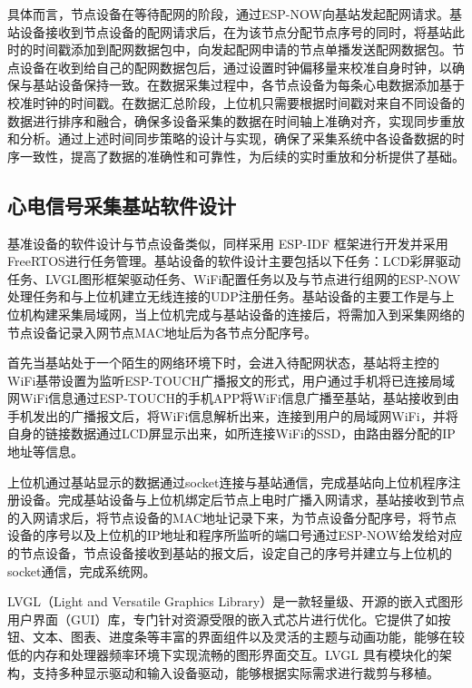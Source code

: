 具体而言，节点设备在等待配网的阶段，通过ESP-NOW向基站发起配网请求。基站设备接收到节点设备的配网请求后，在为该节点分配节点序号的同时，将基站此时的时间戳添加到配网数据包中，向发起配网申请的节点单播发送配网数据包。节点设备在收到给自己的配网数据包后，通过设置时钟偏移量来校准自身时钟，以确保与基站设备保持一致。在数据采集过程中，各节点设备为每条心电数据添加基于校准时钟的时间戳。在数据汇总阶段，上位机只需要根据时间戳对来自不同设备的数据进行排序和融合，确保多设备采集的数据在时间轴上准确对齐，实现同步重放和分析。通过上述时间同步策略的设计与实现，确保了采集系统中各设备数据的时序一致性，提高了数据的准确性和可靠性，为后续的实时重放和分析提供了基础。

\newpage    %

\subsection{心电信号采集基站软件设计}

基准设备的软件设计与节点设备类似，同样采用 ESP-IDF 框架进行开发并采用FreeRTOS进行任务管理。基站设备的软件设计主要包括以下任务：LCD彩屏驱动任务、LVGL图形框架驱动任务、WiFi配置任务以及与节点进行组网的ESP-NOW处理任务和与上位机建立无线连接的UDP注册任务。基站设备的主要工作是与上位机构建采集局域网，当上位机完成与基站设备的连接后，将需加入到采集网络的节点设备记录入网节点MAC地址后为各节点分配序号。

首先当基站处于一个陌生的网络环境下时，会进入待配网状态，基站将主控的WiFi基带设置为监听ESP-TOUCH广播报文的形式，用户通过手机将已连接局域网WiFi信息通过ESP-TOUCH的手机APP将WiFi信息广播至基站，基站接收到由手机发出的广播报文后，将WiFi信息解析出来，连接到用户的局域网WiFi，并将自身的链接数据通过LCD屏显示出来，如所连接WiFi的SSD，由路由器分配的IP地址等信息。

上位机通过基站显示的数据通过socket连接与基站通信，完成基站向上位机程序注册设备。完成基站设备与上位机绑定后节点上电时广播入网请求，基站接收到节点的入网请求后，将节点设备的MAC地址记录下来，为节点设备分配序号，将节点设备的序号以及上位机的IP地址和程序所监听的端口号通过ESP-NOW给发给对应的节点设备，节点设备接收到基站的报文后，设定自己的序号并建立与上位机的socket通信，完成系统网。

LVGL（Light and Versatile Graphics Library）是一款轻量级、开源的嵌入式图形用户界面（GUI）库，专门针对资源受限的嵌入式芯片进行优化。它提供了如按钮、文本、图表、进度条等丰富的界面组件以及灵活的主题与动画功能，能够在较低的内存和处理器频率环境下实现流畅的图形界面交互。LVGL 具有模块化的架构，支持多种显示驱动和输入设备驱动，能够根据实际需求进行裁剪与移植。


